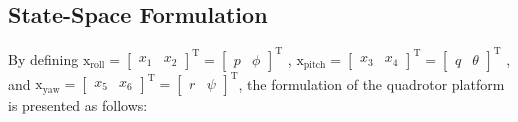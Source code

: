 \documentclass[3p]{elsarticle}
\begin{document}
\subsection{State-Space Formulation}\label{sec:state-space}
\noindent By defining $\boldsymbol{\mathrm{x}}_{\text{roll}} = \begin{bmatrix}
    x_1 & x_2
\end{bmatrix}^{\mathrm{T}}=
\begin{bmatrix}
    p & \phi
\end{bmatrix}^{\mathrm{T}}$
,
$\boldsymbol{\mathrm{x}}_{\text{pitch}} = \begin{bmatrix}
    x_3 & x_4 \end{bmatrix}^{\mathrm{T}} = 
    \begin{bmatrix}
    q & \theta \end{bmatrix}^{\mathrm{T}}
    $
    , and
    $\boldsymbol{\mathrm{x}}_{\text{yaw}} = 
    \begin{bmatrix}
        x_5 & x_6
    \end{bmatrix}^{\mathrm{T}} = 
    \begin{bmatrix}
        r & \psi
    \end{bmatrix}^{\mathrm{T}}$, the formulation of the quadrotor platform is presented as follows:
\end{document}
